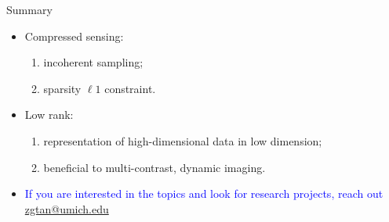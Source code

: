 \documentclass[aspectratio=169]{beamer}
\begin{document}
	\begin{frame}{Summary}
		
		\begin{itemize}
			\item <1-> Compressed sensing:
			\begin{enumerate}
				\vspace{0.5em}
				\item incoherent sampling;
				\vspace{0.5em}
				\item sparsity $\ell1$ constraint.
			\end{enumerate}
			
			\vspace{1em}
			\item <2-> Low rank:
			\begin{enumerate}
				\vspace{0.5em}
				\item representation of high-dimensional data in low dimension;
				\vspace{0.5em}
				\item beneficial to multi-contrast, dynamic imaging.
			\end{enumerate}
			
			\vspace{1em}
			\item <3-> {\textcolor{blue}{If you are interested in the topics and look for research projects, reach out \href{mailto:zgtan@umich.edu}{zgtan@umich.edu}}}
		
		\end{itemize}
	\end{frame}
	
	
	
\end{document}
